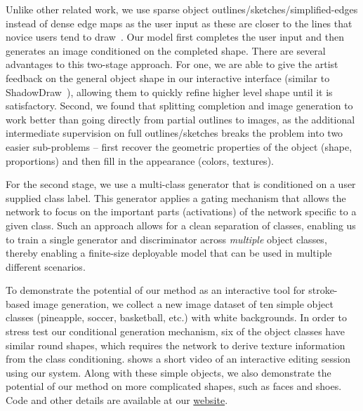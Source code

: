Unlike other related work, we use sparse object outlines/sketches/simplified-edges instead of dense edge maps as the user input
as these are closer to the lines that novice users tend to draw~\cite{cole2008people}. 
Our model first completes the user input and then generates an image conditioned on the completed shape. There are several advantages to this two-stage approach.
For one, we are able to give the artist feedback on the general object shape in our interactive interface (similar to ShadowDraw~\cite{lee2011shadowdraw}), allowing them to quickly refine higher level shape until it is satisfactory.
Second, we found that splitting completion and image generation to work better than going directly from partial outlines to images, as the additional intermediate supervision on full outlines/sketches breaks the problem into two easier sub-problems -- first recover the geometric properties of the object (shape, proportions) and then fill in the appearance (colors, textures). 


For the second stage, we use a multi-class generator that is conditioned on a user supplied class label. This generator applies a gating mechanism that allows the network to focus on the important parts (activations) of the network specific to a given class. Such an approach allows for a clean separation of classes, enabling us to train a single generator and discriminator across \emph{multiple} object classes, thereby enabling a finite-size deployable model that can be used in multiple different scenarios. %

To demonstrate the potential of our method as an interactive tool for stroke-based image generation, we collect a new image dataset of ten simple object classes (pineapple, soccer, basketball, etc.) with white backgrounds. In order to stress test our conditional generation mechanism, six of the object classes have similar round shapes, which requires the network to derive texture information from the class conditioning.  shows a short video of an interactive editing session using our system. Along with these simple objects, we also demonstrate the potential of our method on more complicated shapes, such as faces and shoes. Code and other details are available at our \href{https://arnabgho.github.io/iSketchNFill/}{website}.



